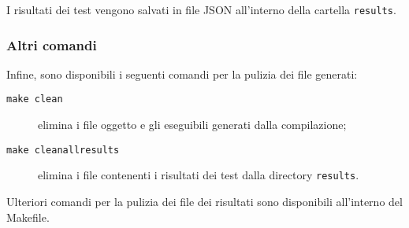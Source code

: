         I risultati dei test vengono salvati in file JSON all'interno della cartella \texttt{results}.


    \subsubsection*{Altri comandi}

        Infine, sono disponibili i seguenti comandi per la pulizia dei file generati:
        \begin{description}
            \item[\texttt{make clean}] elimina i file oggetto e gli eseguibili generati dalla compilazione;
            \item[\texttt{make cleanallresults}] elimina i file contenenti i risultati dei test dalla directory \texttt{results}.
        \end{description}

        Ulteriori comandi per la pulizia dei file dei risultati sono disponibili all'interno del Makefile.
